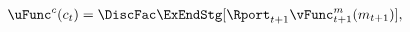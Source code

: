   \begin{equation}\begin{gathered}\begin{aligned}
        \uFunc^{c}(c_{t})  & = \DiscFac \ExEndStg [{\Rport}_{t+1} \vFunc^{m}_{t+1}(m_{t+1})] \label{eq:valfuncFOCRtilde},
      \end{aligned}\end{gathered}\end{equation}
